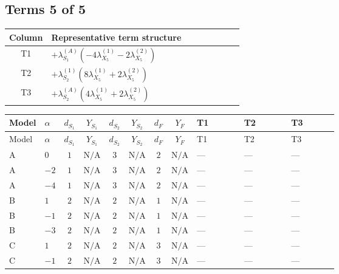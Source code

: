 \documentclass[8pt]{article}
\begin{document}
\begin{landscape}
\subsection*{Terms 5 of 5}
\begin{center}
\begin{tabular}{@{}c >{\raggedright\arraybackslash}p{0.82\linewidth}@{}}
\toprule
Column & Representative term structure \\
\midrule
T1 & \(\displaystyle +{\lambda_{S_1}^{(A)}} (-4 {\lambda_{X_{5}}^{(1)}}-2 {\lambda_{X_{5}}^{(2)}})\) \\
\midrule
T2 & \(\displaystyle +{\lambda_{S_2}^{(1)}} (8 {\lambda_{X_{5}}^{(1)}}+2 {\lambda_{X_{5}}^{(2)}})\) \\
\midrule
T3 & \(\displaystyle +{\lambda_{S_2}^{(A)}} (4 {\lambda_{X_{5}}^{(1)}}+2 {\lambda_{X_{5}}^{(2)}})\) \\
\midrule
\bottomrule
\end{tabular}
\end{center}
\smallskip
\tiny
\begin{longtable}{@{}llcccccc >{\raggedright\arraybackslash}p{0.21\linewidth} >{\raggedright\arraybackslash}p{0.21\linewidth} >{\raggedright\arraybackslash}p{0.21\linewidth}@{}}
\toprule
Model & $\alpha$ & $d_{S_1}$ & $Y_{S_1}$ & $d_{S_2}$ & $Y_{S_2}$ & $d_F$ & $Y_F$ & T1 & T2 & T3 \\
\midrule
\endfirsthead
\toprule
Model & $\alpha$ & $d_{S_1}$ & $Y_{S_1}$ & $d_{S_2}$ & $Y_{S_2}$ & $d_F$ & $Y_F$ & T1 & T2 & T3 \\
\midrule
\endhead
A & $0$ & $1$ & $\text{N/A}$ & $3$ & $\text{N/A}$ & $2$ & $\text{N/A}$ & --- & --- & --- \\
\midrule
A & $-2$ & $1$ & $\text{N/A}$ & $3$ & $\text{N/A}$ & $2$ & $\text{N/A}$ & --- & --- & --- \\
\midrule
A & $-4$ & $1$ & $\text{N/A}$ & $3$ & $\text{N/A}$ & $2$ & $\text{N/A}$ & --- & --- & --- \\
\midrule
B & $1$ & $2$ & $\text{N/A}$ & $2$ & $\text{N/A}$ & $1$ & $\text{N/A}$ & --- & --- & --- \\
\midrule
B & $-1$ & $2$ & $\text{N/A}$ & $2$ & $\text{N/A}$ & $1$ & $\text{N/A}$ & --- & --- & --- \\
\midrule
B & $-3$ & $2$ & $\text{N/A}$ & $2$ & $\text{N/A}$ & $1$ & $\text{N/A}$ & --- & --- & --- \\
\midrule
C & $1$ & $2$ & $\text{N/A}$ & $2$ & $\text{N/A}$ & $3$ & $\text{N/A}$ & --- & --- & --- \\
\midrule
C & $-1$ & $2$ & $\text{N/A}$ & $2$ & $\text{N/A}$ & $3$ & $\text{N/A}$ & --- & --- & --- \\

\end{longtable}
\end{landscape}
\end{document}
